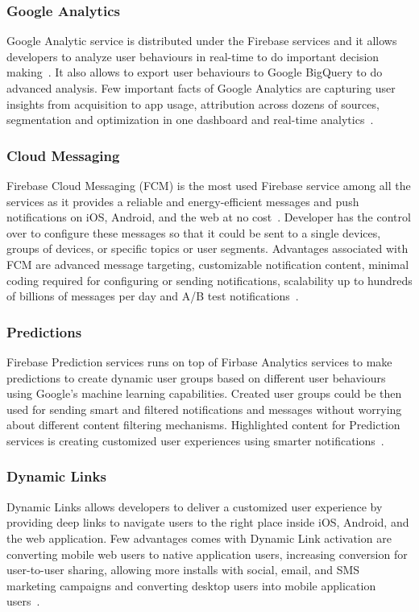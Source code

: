 \subsubsection{Google Analytics}
Google Analytic service is distributed under the Firebase services and it 
allows developers to analyze user behaviours in real-time to do important 
decision making~\cite{hid-sp18-409-www-firebase}. It also allows to export user 
behaviours to Google BigQuery to do advanced analysis. Few important facts of 
Google Analytics are capturing user insights from acquisition to app usage, 
attribution across dozens of sources, segmentation and optimization in one 
dashboard and real-time analytics~\cite{hid-sp18-409-www-firebase-products}.

\subsubsection{Cloud Messaging}
Firebase Cloud Messaging (FCM) is the most used Firebase service among all the 
services as it provides a reliable and energy-efficient messages and push 
notifications on iOS, Android, and the web at no 
cost~\cite{hid-sp18-409-www-firebase-products}. Developer has the control over 
to configure these messages so that it could be sent to a single devices, 
groups of devices, or specific topics or user segments. Advantages associated 
with FCM are advanced message targeting, customizable notification content, 
minimal coding required for configuring or sending notifications, scalability 
up to hundreds of billions of messages per day and A/B test 
notifications~\cite{hid-sp18-409-www-firebase-merged, 
	hid-sp18-409-www-firebase-products}.

\subsubsection{Predictions}
Firebase Prediction services runs on top of Firbase Analytics services to make 
predictions to create dynamic user groups based on different user behaviours 
using Google's machine learning capabilities. Created user groups could be then 
used for sending smart and filtered notifications and messages without worrying 
about different content filtering mechanisms. Highlighted content for 
Prediction services is creating customized user experiences using smarter 
notifications~\cite{hid-sp18-409-www-firebase-products}.

\subsubsection{Dynamic Links}
Dynamic Links allows developers to deliver a customized user experience by 
providing deep links to navigate users to the right place inside iOS, Android, 
and the web application. Few advantages comes with Dynamic Link activation are 
converting mobile web users to native application users, increasing conversion 
for user-to-user sharing, allowing more installs with social, email, and SMS 
marketing campaigns and converting desktop users into mobile application 
users~\cite{hid-sp18-409-www-firebase-wikipedia, 
	hid-sp18-409-www-firebase-products}.


